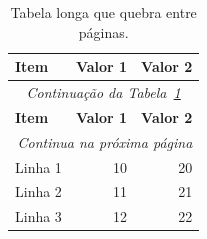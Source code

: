 
\begin{longtable}{lrr}
  \caption{Tabela longa que quebra entre páginas.}
  \label{tab:longa} \\
  \toprule
  \textbf{Item} & \textbf{Valor 1} & \textbf{Valor 2} \\
  \midrule
  \endfirsthead

  \multicolumn{3}{c}{\textit{Continuação da Tabela~\ref{tab:longa}}} \\
  \toprule
  \textbf{Item} & \textbf{Valor 1} & \textbf{Valor 2} \\
  \midrule
  \endhead

  \midrule
  \multicolumn{3}{r}{\textit{Continua na próxima página}} \\
  \endfoot

  \bottomrule
  \endlastfoot

  Linha 1 & 10 & 20 \\
  Linha 2 & 11 & 21 \\
  Linha 3 & 12 & 22 \\
\end{longtable}

